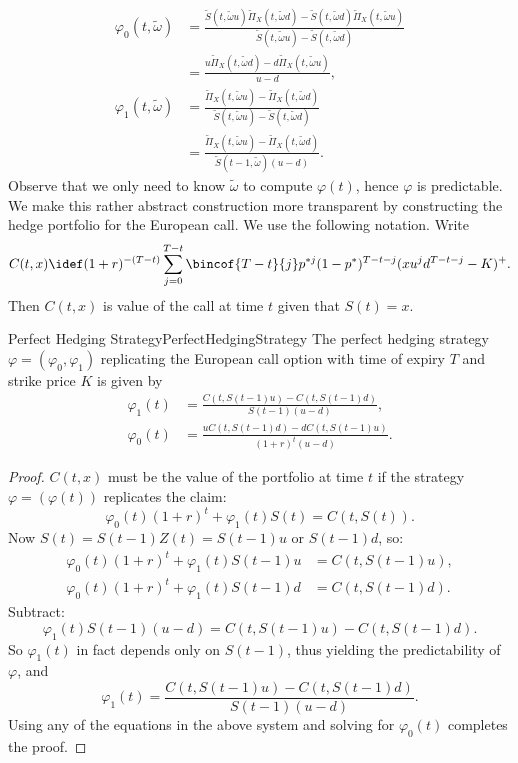 \begin{align*}
	\varphi_0(t, \tilde{\omega}) & = \frac{\tilde{S}(t, \tilde{\omega}u)\tilde{\Pi}_X(t, \tilde{\omega}d) - \tilde{S}(t, \tilde{\omega}d)\tilde{\Pi}_X(t, \tilde{\omega}u)}{\tilde{S}(t, \tilde{\omega}u) - \tilde{S}(t, \tilde{\omega}d)} \\
	                             & = \frac{u\tilde{\Pi}_X(t, \tilde{\omega}d) - d\tilde{\Pi}_X(t, \tilde{\omega}u)}{u-d},                                                                                                                  \\[8pt]
	\varphi_1(t, \tilde{\omega}) & = \frac{\tilde{\Pi}_X(t, \tilde{\omega}u) - \tilde{\Pi}_X(t, \tilde{\omega}d)}{\tilde{S}(t, \tilde{\omega}u) - \tilde{S}(t, \tilde{\omega}d)}                                                           \\
	                             & = \frac{\tilde{\Pi}_X(t, \tilde{\omega}u) - \tilde{\Pi}_X(t, \tilde{\omega}d)}{\tilde{S}(t-1, \tilde{\omega})(u-d)}.
\end{align*}
Observe that we only need to know \(\tilde{\omega}\) to compute \(\varphi(t)\), hence \(\varphi\) is predictable. We make this rather abstract construction more transparent by constructing the hedge portfolio for the European call. We use the following notation. Write
\[
	C(t, x) \idef (1+r)^{-(T-t)} \sum_{j=0}^{T-t} \bincof{T-t}{j} p^{*j} (1-p^*)^{T-t-j} (x u^j d^{T-t-j} - K)^+.
\]
Then \(C(t, x)\) is value of the call at time \(t\) given that \(S(t) = x\).

\begin{prop}{Perfect Hedging Strategy}{PerfectHedgingStrategy}
	The perfect hedging strategy \(\varphi = (\varphi_0, \varphi_1)\) replicating the European call option with time of expiry \(T\) and strike price \(K\) is given by
	\begin{align*}
		\varphi_1(t) & = \frac{C(t, S(t-1)u) - C(t, S(t-1)d)}{S(t-1)(u-d)},    \\
		\varphi_0(t) & = \frac{uC(t, S(t-1)d) - dC(t, S(t-1)u)}{(1+r)^t(u-d)}.
	\end{align*}
\end{prop}

\begin{proof}
	\(C(t, x)\) must be the value of the portfolio at time \(t\) if the strategy \(\varphi = (\varphi(t))\) replicates the claim:
	\[
		\varphi_0(t)(1+r)^t + \varphi_1(t)S(t) = C(t, S(t)).
	\]
	Now \(S(t) = S(t-1)Z(t) = S(t-1)u\) or \(S(t-1)d\), so:
	\begin{align*}
		\varphi_0(t)(1+r)^t + \varphi_1(t)S(t-1)u & = C(t, S(t-1)u), \\
		\varphi_0(t)(1+r)^t + \varphi_1(t)S(t-1)d & = C(t, S(t-1)d).
	\end{align*}
	Subtract:
	\[
		\varphi_1(t)S(t-1)(u-d) = C(t, S(t-1)u) - C(t, S(t-1)d).
	\]
	So \(\varphi_1(t)\) in fact depends only on \(S(t-1)\), thus yielding the predictability of \(\varphi\), and
	\[
		\varphi_1(t) = \frac{C(t, S(t-1)u) - C(t, S(t-1)d)}{S(t-1)(u-d)}.
	\]
	Using any of the equations in the above system and solving for \(\varphi_0(t)\) completes the proof.
\end{proof}

